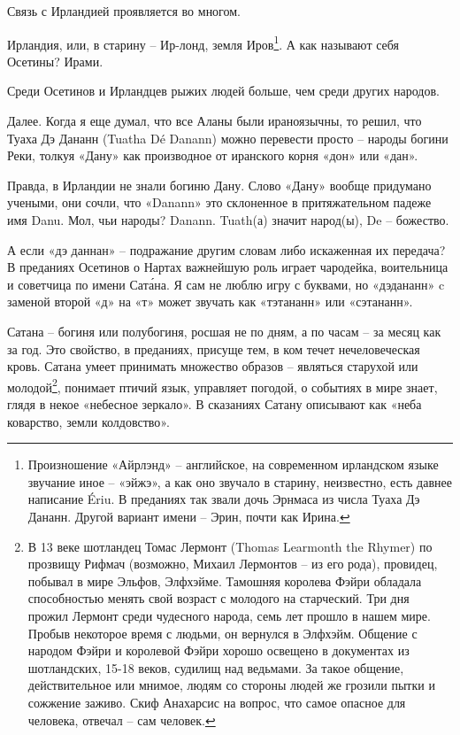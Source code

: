 Связь с Ирландией проявляется во многом.

Ирландия, или, в старину – Ир-лонд, земля Иров\footnote{Произношение «Айрлэнд» – английское, на современном ирландском языке звучание иное – «эйжэ», а как оно звучало в старину, неизвестно, есть давнее написание Ériu. В преданиях так звали дочь Эрнмаса из числа Туаха Дэ Дананн. Другой вариант имени – Эрин, почти как Ирина.}. А как называют себя Осетины? Ирами.

Среди Осетинов и Ирландцев рыжих людей больше, чем среди других народов.

Далее. Когда я еще думал, что все Аланы были ираноязычны, то решил, что Туаха Дэ Дананн (Tuatha Dé Danann) можно перевести просто – народы богини Реки, толкуя «Дану» как производное от иранского корня «дон» или «дан».

Правда, в Ирландии не знали богиню Дану. Слово «Дану» вообще придумано учеными, они сочли, что «Danann» это склоненное в притяжательном падеже имя Danu. Мол, чьи народы? Danann. Tuath(а) значит народ(ы), De – божество.%

А если «дэ даннан» – подражание другим словам либо искаженная их передача? В преданиях Осетинов о Нартах важнейшую роль играет чародейка, воительница и советчица по имени Сат\'ана. Я сам не люблю игру с буквами, но «дэдананн» c заменой второй «д» на «т» может звучать как «тэтананн» или «сэтананн».

Сатана – богиня или полубогиня, росшая не по дням, а по часам – за месяц как за год. Это свойство, в преданиях, присуще тем, в ком течет нечеловеческая кровь. Сатана умеет принимать множество образов – являться старухой или молодой\footnote{В 13 веке шотландец Томас Лермонт (Thomas Learmonth the Rhymer) по прозвищу Рифмач (возможно, Михаил Лермонтов – из его рода), провидец, побывал в мире Эльфов, Элфхэйме. Тамошняя королева Фэйри обладала способностью менять свой возраст с молодого на старческий. Три дня прожил Лермонт среди чудесного народа, семь лет прошло в нашем мире. Пробыв некоторое время с людьми, он вернулся в Элфхэйм. Общение с народом Фэйри и королевой Фэйри хорошо освещено в документах из шотландских, 15-18 веков, судилищ над ведьмами. За такое общение, действительное или мнимое, людям со стороны людей же грозили пытки и сожжение заживо. Скиф Анахарсис на вопрос, что самое опасное для человека, отвечал – сам человек.}, понимает птичий язык, управляет погодой, о событиях в мире знает, глядя в некое «небесное зеркало». В сказаниях Сатану описывают как «неба коварство, земли колдовство». 

